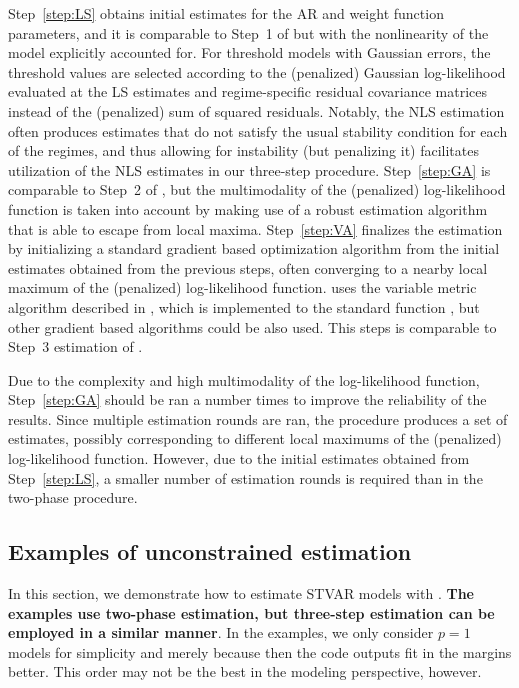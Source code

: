 \documentclass[nojss]{jss}
\begin{document}
Step~\ref{step:LS} obtains initial estimates for the AR and weight function parameters, and it is comparable to Step~1 of \cite{Lanne+Meitz+Saikkonen:2017} but with the nonlinearity of the model explicitly accounted for. For threshold models with Gaussian errors, the threshold values are selected according to the (penalized) Gaussian log-likelihood evaluated at the LS estimates and regime-specific residual covariance matrices instead of the (penalized) sum of squared residuals. Notably, the NLS estimation often produces estimates that do not satisfy the usual stability condition for each of the regimes, and thus allowing for instability (but penalizing it) facilitates utilization of the NLS estimates in our three-step procedure. Step~\ref{step:GA} is comparable to Step~2 of \cite{Lanne+Meitz+Saikkonen:2017}, but the multimodality of the (penalized) log-likelihood function is taken into account by making use of a robust estimation algorithm that is able to escape from local maxima. Step~\ref{step:VA} finalizes the estimation by initializing a standard gradient based optimization algorithm from the initial estimates obtained from the previous steps, often converging to a nearby local maximum of the (penalized) log-likelihood function.  uses the variable metric algorithm described in \citep[][Algorithm~21]{Nash:1990}, which is implemented to the standard  function , but other gradient based algorithms could be also used. This steps is comparable to Step~3 estimation of \cite{Lanne+Meitz+Saikkonen:2017}.

Due to the complexity and high multimodality of the log-likelihood function, Step~\ref{step:GA} should be ran a number times to improve the reliability of the results. Since multiple estimation rounds are ran, the procedure produces a set of estimates, possibly corresponding to different local maximums of the (penalized) log-likelihood function. However, due to the initial estimates obtained from Step~\ref{step:LS}, a smaller number of estimation rounds is required than in the two-phase procedure.


\subsection{Examples of unconstrained estimation}\label{sec:example_estim}

In this section, we demonstrate how to estimate STVAR models with . \textbf{The examples use two-phase estimation, but three-step estimation can be employed in a similar manner}. In the examples, we only consider $p=1$ models for simplicity and merely because then the code outputs fit in the margins better. This order may not be the best in the modeling perspective, however.
\end{document}
